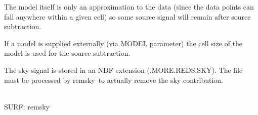 \documentclass[twoside,11pt]{article}
\newcommand{\task}[1]{{\sf #1}}
\newcommand{\remsky}{\htmlref{\task{remsky}}{REMSKY}}
\newcommand{\htmlref}[2]{#1}
\renewcommand{\_}{\texttt{\symbol{95}}}
\newcommand{\sstdiytopic}[2]{\item[{\hspace{-0.35em}#1\hspace{-0.35em}:}]
\mbox{} \\[1.3ex] #2}
\newcommand{\sstitem}{\item}
\newcommand{\sstdiytopic}[2]{\item[{#1}] #2 }
\newcommand{\sstitem}{\item}
\begin{document}
{{{         \sstitem
         The model itself is only an approximation
           to the data (since the data points can fall anywhere within
           a given cell) so some source signal will remain after source
           subtraction.

         \sstitem
         If a model is supplied externally (via MODEL parameter) the
           cell size of the model is used for the source subtraction.

         \sstitem
         The sky signal is stored in an NDF extension (.MORE.REDS.SKY).
           The file must be processed by \remsky\ to actually remove the
           sky contribution.
      }
   }
   \sstdiytopic{
      Related Applications
   }{
      SURF: \remsky
   }
}




\newpage
\label{surf:chgdata}
\end{document}
